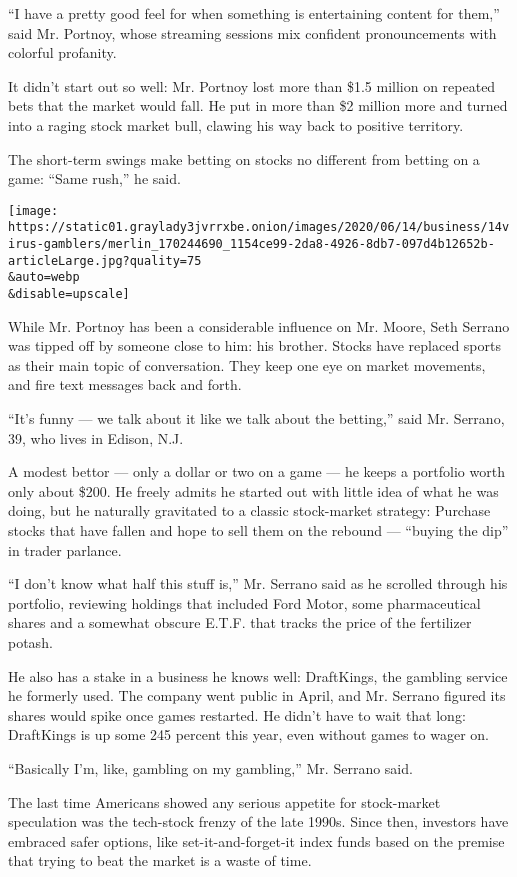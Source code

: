``I have a pretty good feel for when something is entertaining content
for them,'' said Mr. Portnoy, whose streaming sessions mix confident
pronouncements with colorful profanity.

It didn't start out so well: Mr. Portnoy lost more than \$1.5 million on
repeated bets that the market would fall. He put in more than \$2
million more and turned into a raging stock market bull, clawing his way
back to positive territory.

The short-term swings make betting on stocks no different from betting
on a game: ``Same rush,'' he said.

\texttt{[image: https://static01.graylady3jvrrxbe.onion/images/2020/06/14/business/14virus-gamblers/merlin\_170244690\_1154ce99-2da8-4926-8db7-097d4b12652b-articleLarge.jpg?quality=75\\\&auto=webp\\\&disable=upscale]}

While Mr. Portnoy has been a considerable influence on Mr. Moore, Seth
Serrano was tipped off by someone close to him: his brother. Stocks have
replaced sports as their main topic of conversation. They keep one eye
on market movements, and fire text messages back and forth.

``It's funny --- we talk about it like we talk about the betting,'' said
Mr. Serrano, 39, who lives in Edison, N.J.

A modest bettor --- only a dollar or two on a game --- he keeps a
portfolio worth only about \$200. He freely admits he started out with
little idea of what he was doing, but he naturally gravitated to a
classic stock-market strategy: Purchase stocks that have fallen and hope
to sell them on the rebound --- ``buying the dip'' in trader parlance.

``I don't know what half this stuff is,'' Mr. Serrano said as he
scrolled through his portfolio, reviewing holdings that included Ford
Motor, some pharmaceutical shares and a somewhat obscure E.T.F. that
tracks the price of the fertilizer potash.

He also has a stake in a business he knows well: DraftKings, the
gambling service he formerly used. The company went public in April, and
Mr. Serrano figured its shares would spike once games restarted. He
didn't have to wait that long: DraftKings is up some 245 percent this
year, even without games to wager on.

``Basically I'm, like, gambling on my gambling,'' Mr. Serrano said.

The last time Americans showed any serious appetite for stock-market
speculation was the tech-stock frenzy of the late 1990s. Since then,
investors have embraced safer options, like set-it-and-forget-it index
funds based on the premise that trying to beat the market is a waste of
time.

